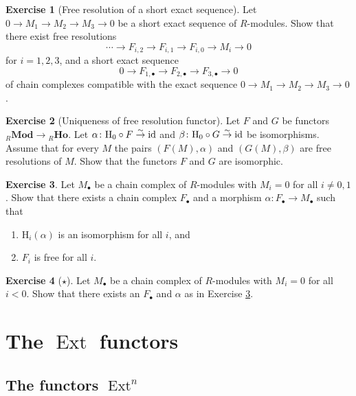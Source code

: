 \documentclass[11pt]{amsbook}
\newcommand{\isomto}{\overset{\sim}{\to}}
\newcommand{\longto}{\longrightarrow}
\DeclareMathOperator\Mod{{\bf{Mod}}}
\DeclareMathOperator\Ext{Ext}
\def\rH{{\mathrm H}} \def\rK{{\mathrm K}} \def\rR{{\mathrm R}}
\def\id{{\rm id}}
\def\Mod{\mathbf{Mod}}
\def\Ho{\mathbf{Ho}}
\theoremstyle{plain}
\theoremstyle{definition}
\newtheorem{exercise}{Exercise}
\begin{document}
\begin{exercise}[Free resolution of a short exact sequence]\label{exc:short-exact-sequence-resolutions}
Let $0\to M_1\to M_2 \to M_3 \to 0$ be a short exact sequence of $R$-modules. Show that there exist free resolutions
\[
	\cdots \longto F_{i,2} \longto F_{i,1} \longto F_{i,0} \longto M_i \longto 0
\]
for $i=1,2,3$, and a short exact sequence
\[
	0 \longto F_{1,\bullet} \longto F_{2,\bullet} \longto F_{3,\bullet} \longto 0
\]
of chain complexes compatible with the exact sequence $0\to M_1\to M_2 \to M_3 \to 0$.
\end{exercise}

\begin{exercise}[Uniqueness of free resolution functor]
Let $F$ and $G$ be functors ${}_R\Mod \to {}_R\Ho$. Let $\alpha\colon \rH_0\circ F\isomto \id$ and $\beta\colon \rH_0\circ G \isomto \id$ be isomorphisms. Assume that for every $M$ the pairs $(F(M),\alpha)$ and $(G(M),\beta)$ are free resolutions of $M$. Show that the functors $F$ and $G$ are isomorphic.
\end{exercise}

\begin{exercise}\label{exc:resolution-of-length-two}
Let $M_\bullet$ be a chain complex of $R$-modules with $M_i=0$ for all $i\not= 0,1$. Show that there exists a chain complex $F_\bullet$ and a morphism $\alpha\colon F_\bullet\to M_\bullet$ such that
\begin{enumerate}
\item $\rH_i(\alpha)$ is an isomorphism for all $i$, and
\item $F_i$ is free for all $i$.
\end{enumerate}
\end{exercise}

\begin{exercise}[$\star$] Let $M_\bullet$ be a chain complex of $R$-modules with $M_i=0$ for all $i<0$. Show that there exists an $F_\bullet$ and $\alpha$ as in Exercise \ref{exc:resolution-of-length-two}.
\end{exercise}


\chapter{The $\Ext$ functors}

\section{The functors $\Ext^n$}
\end{document}
